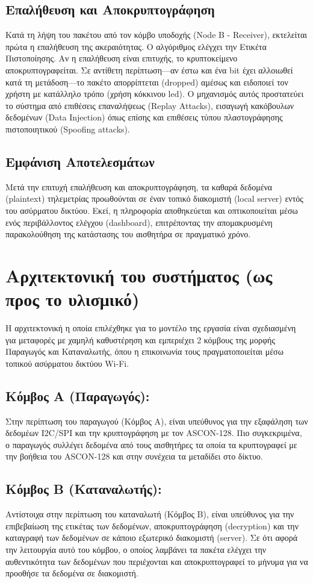 \documentclass[runningheads]{llncs}
\begin{document}
\subsection{Επαλήθευση και Αποκρυπτογράφηση}
Κατά τη λήψη του πακέτου από τον κόμβο υποδοχής (Node B - Receiver), εκτελείται πρώτα η επαλήθευση της ακεραιότητας. Ο αλγόριθμος ελέγχει την Ετικέτα Πιστοποίησης.
Αν η επαλήθευση είναι επιτυχής, το κρυπτοκείμενο αποκρυπτογραφείται. Σε αντίθετη περίπτωση—αν έστω και ένα bit έχει αλλοιωθεί κατά τη μετάδοση—το πακέτο απορρίπτεται (dropped)
αμέσως και ειδοποιεί τον χρήστη με κατάλληλο τρόπο (χρήση κόκκινου led). 
Ο μηχανισμός αυτός προστατεύει το σύστημα από επιθέσεις επαναλήψεως (Replay Attacks), εισαγωγή κακόβουλων δεδομένων (Data Injection) 
όπως επίσης και επιθέσεις τύπου πλαστογράφησης πιστοποιητικού (Spoofing attacks).

\subsection{Εμφάνιση Αποτελεσμάτων}
Μετά την επιτυχή επαλήθευση και αποκρυπτογράφηση, τα καθαρά δεδομένα (plaintext) τηλεμετρίας προωθούνται σε έναν τοπικό διακομιστή (local server) εντός του ασύρματου δικτύου. 
Εκεί, η πληροφορία αποθηκεύεται και οπτικοποιείται μέσω ενός περιβάλλοντος ελέγχου (dashboard), επιτρέποντας την απομακρυσμένη παρακολούθηση της κατάστασης του αισθητήρα σε πραγματικό χρόνο.  




\section{Αρχιτεκτονική του συστήματος (ως προς το υλισμικό)}
    Η αρχιτεκτονική η οποία επιλέχθηκε για το μοντέλο της εργασία είναι σχεδιασμένη για μεταφορές με χαμηλή καθυστέρηση και εμπεριέχει 2 κόμβους της μορφής 
    Παραγωγός και Καταναλωτής, όπου η επικοινωνία τους πραγματοποιείται μέσω τοπικού ασύρματου δικτύου Wi-Fi.
        \subsection{\textbf{Κόμβος A (Παραγωγός):}}
          Στην περίπτωση του παραγωγού (Κόμβος A), είναι υπεύθυνος για την εξαφάληση των δεδομέων I2C/SPI και την κρυπτογράφηση με τον ASCON-128. Πιο συγκεκριμένα, ο παραγωγός συλλέγει δεδομένα 
          από τους αισθητήρες τα οποία τα κρυπτογραφεί με την βοήθεια του ASCON-128 και στην συνέχεια τα μεταδίδει στο δίκτυο.
          
         \subsection{\textbf{Κόμβος B (Καταναλωτής):}}
          Αντίστοιχα στην περίπτωση του καταναλωτή (Κόμβος B), είναι υπεύθυνος για την επιβεβαίωση της ετικέτας των δεδομένων, αποκρυπτογράφηση (decryption) 
          και την καταγραφή των δεδομένων σε κάποιο εξωτερικό διακομιστή (server). Σε ότι αφορά την λειτουργία αυτό του κόμβου,
          ο οποίος λαμβάνει τα πακέτα ελέγχει την αυθεντικότητα των δεδομένων που περιέχονται και αποκρυπτογραφεί το μήνυμα για να προοθήσε τα δεδομένα σε διακομιστή.
\end{document}
